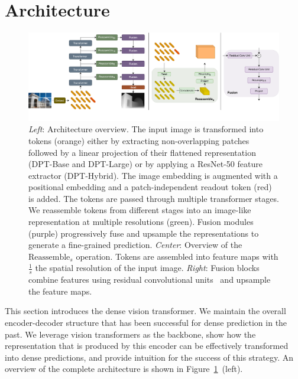\documentclass[10pt,twocolumn,letterpaper]{article}
\begin{document}
\section{Architecture}

\begin{figure}
  \centering
  \includegraphics[width=1.0\linewidth,trim={0 16mm 0 0}, clip]{images/diagrams/dense_transformer}
  \vspace{-3.5mm}
  \caption{\emph{Left}: Architecture overview. The input image is transformed
    into tokens (orange) either by extracting non-overlapping patches followed
    by a linear projection of their flattened representation (DPT-Base and
    DPT-Large) or by applying a ResNet-50 feature extractor (DPT-Hybrid). The
    image embedding is augmented with a positional embedding and a
    patch-independent readout token (red) is added. The tokens are passed
    through multiple transformer stages. We reassemble tokens from different
    stages into an image-like representation at multiple resolutions (green).
    Fusion modules (purple) progressively fuse and upsample the representations
    to generate a fine-grained prediction. \emph{Center}: Overview of the
    $\textrm{Reassemble}_{s}$ operation. Tokens are assembled into feature maps
    with $\tfrac{1}{s}$ the spatial resolution of the input image. \emph{Right}:
    Fusion blocks combine features using residual convolutional
    units~\cite{Lin2017} and upsample the feature maps.}
  \label{fig:architecture}
\end{figure}

This section introduces the dense vision transformer. We maintain the overall
encoder-decoder structure that has been successful for dense prediction in the
past. We leverage vision transformers \cite{Dosovitskiy2020} as the backbone,
show how the representation that is produced by this encoder can be effectively
transformed into dense predictions, and provide intuition for the success of
this strategy. An overview of the complete architecture is shown in
Figure~\ref{fig:architecture}~(left).
\end{document}
